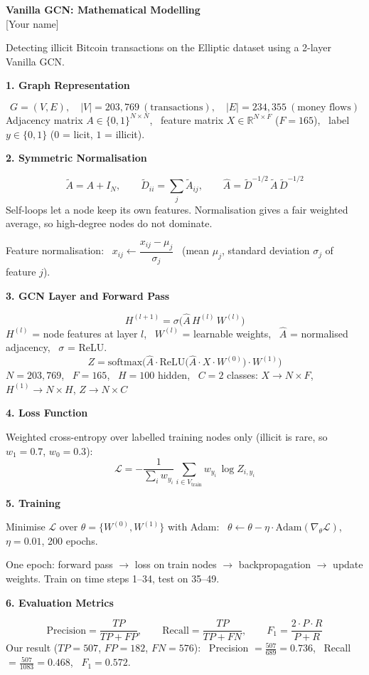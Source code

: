 \documentclass[12pt,a4paper]{article}
\newcommand{\Ahat}{\hat A}
\newcommand{\R}{\mathbb{R}}
\newcommand{\h}[1]{\par\needspace{6\baselineskip}\medskip\textbf{\large #1}\par}
\begin{document}
\begin{center}
{\Large\bfseries Vanilla GCN: Mathematical Modelling}\\[4pt]
[Your name] \quad [Roll no.]
\end{center}
Detecting illicit Bitcoin transactions on the Elliptic dataset using a 2-layer Vanilla GCN.

\h{1. Graph Representation}
\[
  G = (V, E), \quad |V| = 203{,}769 \ (\text{transactions}), \quad |E| = 234{,}355 \ (\text{money flows})
\]
Adjacency matrix $A \in \{0,1\}^{N\times N}$, \ feature matrix $X \in \R^{N\times F}$ ($F = 165$), \
label $y \in \{0, 1\}$ ($0$ = licit, $1$ = illicit).

\h{2. Symmetric Normalisation}
\[
  \tilde A = A + I_N, \qquad \tilde D_{ii} = \sum_j \tilde A_{ij}, \qquad \Ahat = \tilde D^{-1/2}\,\tilde A\,\tilde D^{-1/2}
\]
Self-loops let a node keep its own features. Normalisation gives a fair weighted average, so high-degree nodes do not dominate.

Feature normalisation: \ $x_{ij} \leftarrow \dfrac{x_{ij} - \mu_j}{\sigma_j}$ \ (mean $\mu_j$, standard deviation $\sigma_j$ of feature $j$).

\h{3. GCN Layer and Forward Pass}
\[
  H^{(l+1)} = \sigma\big(\Ahat\, H^{(l)}\, W^{(l)}\big)
\]
$H^{(l)}$ = node features at layer $l$, \ $W^{(l)}$ = learnable weights, \ $\Ahat$ = normalised adjacency,
\ $\sigma$ = ReLU.
\[
  Z = \mathrm{softmax}\Big(\Ahat\cdot \mathrm{ReLU}\big(\Ahat\cdot X\cdot W^{(0)}\big)\cdot W^{(1)}\Big)
\]
$N = 203{,}769$, \ $F = 165$, \ $H = 100$ hidden, \ $C = 2$ classes:
\quad $X \rightarrow N\times F$, \quad $H^{(1)} \rightarrow N\times H$, \quad $Z \rightarrow N\times C$

\h{4. Loss Function}
Weighted cross-entropy over labelled training nodes only (illicit is rare, so $w_1 = 0.7$, $w_0 = 0.3$):
\[
  \mathcal L = -\frac{1}{\sum_i w_{y_i}} \sum_{i\in V_{\text{train}}} w_{y_i}\, \log Z_{i, y_i}
\]

\h{5. Training}
Minimise $\mathcal L$ over $\theta = \{W^{(0)}, W^{(1)}\}$ with Adam: \
$\theta \leftarrow \theta - \eta\cdot\text{Adam}(\nabla_\theta\mathcal L)$, \ $\eta = 0.01$, 200 epochs.

One epoch: forward pass $\rightarrow$ loss on train nodes $\rightarrow$ backpropagation $\rightarrow$ update weights.
Train on time steps 1--34, test on 35--49.

\h{6. Evaluation Metrics}
\[
  \text{Precision} = \frac{TP}{TP + FP}, \qquad \text{Recall} = \frac{TP}{TP + FN}, \qquad
  F_1 = \frac{2\cdot P\cdot R}{P + R}
\]
Our result ($TP = 507$, $FP = 182$, $FN = 576$): \
Precision $= \frac{507}{689} = 0.736$, \ Recall $= \frac{507}{1083} = 0.468$, \ $F_1 = 0.572$.
\end{document}
